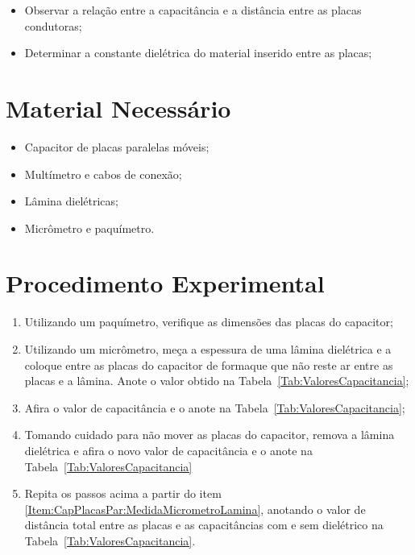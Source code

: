 \begin{itemize}
	\item Observar a relação entre a capacitância e a distância entre as placas condutoras;
	\item Determinar a constante dielétrica do material inserido entre as placas;
\end{itemize}

\section{Material Necessário}

\begin{itemize}
	\item Capacitor de placas paralelas móveis;
	\item Multímetro e cabos de conexão;
	\item Lâmina dielétricas;
	\item Micrômetro e paquímetro.
\end{itemize}

\section{Procedimento Experimental}

\begin{enumerate}
	\item Utilizando um paquímetro, verifique as dimensões das placas do capacitor;
	\item Utilizando um micrômetro, meça a espessura de uma lâmina dielétrica e a coloque entre as placas do capacitor de formaque que não reste ar entre as placas e a lâmina. Anote o valor obtido na Tabela~\ref{Tab:ValoresCapacitancia};\label{Item:CapPlacasPar:MedidaMicrometroLamina}
	\item Afira o valor de capacitância e o anote na Tabela~\ref{Tab:ValoresCapacitancia};
	\item Tomando cuidado para não mover as placas do capacitor, remova a lâmina dielétrica e afira o novo valor de capacitância e o anote na Tabela~\ref{Tab:ValoresCapacitancia}
	\item Repita os passos acima a partir do item \ref{Item:CapPlacasPar:MedidaMicrometroLamina}, anotando o valor de distância total entre as placas e as capacitâncias com e sem dielétrico na Tabela~\ref{Tab:ValoresCapacitancia}.
\end{enumerate}

